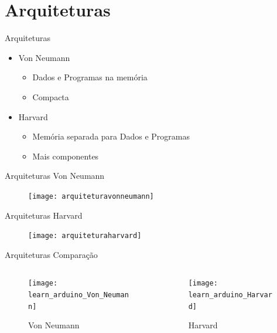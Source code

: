 \documentclass[t]{beamer}
\begin{document}
\section{Arquiteturas}

\begin{frame}{Arquiteturas}
	\begin{itemize}
		\item Von Neumann
		\begin{itemize}
			\item Dados e Programas na memória
			\item Compacta
		\end{itemize}
		\item Harvard
		\begin{itemize}
			\item Memória separada para Dados e Programas
			\item Mais componentes
		\end{itemize}
	\end{itemize}
\end{frame}

\begin{frame}{Arquiteturas}
	Von Neumann
	
	\begin{figure}
		\texttt{[image: arquiteturavonneumann]}
	\end{figure}
\end{frame}

\begin{frame}{Arquiteturas}
	Harvard
	\begin{figure}
		\texttt{[image: arquiteturaharvard]}
	\end{figure}
\end{frame}

\begin{frame}{Arquiteturas}
	Comparação
	\begin{columns}
		\begin{column}{0.5\linewidth}
			\begin{figure}
				\texttt{[image: learn\_arduino\_Von\_Neumann]}
				\caption{Von Neumann}
			\end{figure}
		\end{column}
		\begin{column}{0.5\linewidth}
			\begin{figure}
				\texttt{[image: learn\_arduino\_Harvard]}
				\caption{Harvard}
			\end{figure}
		\end{column}
	\end{columns}
\end{frame}
\end{document}
